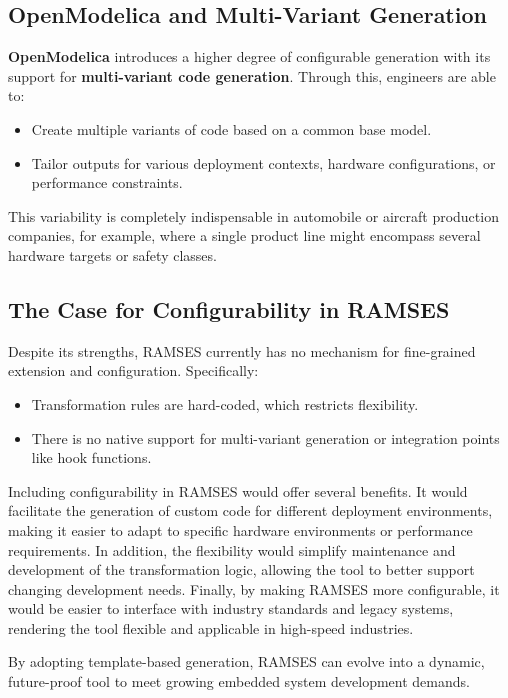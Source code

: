 \subsection*{OpenModelica and Multi-Variant Generation}

\textbf{OpenModelica} introduces a higher degree of configurable generation with its support for \textbf{multi-variant code generation}. Through this, engineers are able to:
\begin{itemize} 
	\item Create multiple variants of code based on a common base model.
	\item Tailor outputs for various deployment contexts, hardware configurations, or performance constraints.
\end{itemize}

This variability is completely indispensable in automobile or aircraft production companies, for example, where a single product line might encompass several hardware targets or safety classes.


\subsection*{The Case for Configurability in RAMSES}

Despite its strengths, \gls{RAMSES} currently has no mechanism for fine-grained extension and configuration.
Specifically:

\begin{itemize} 
	\item Transformation rules are hard-coded, which restricts flexibility.
	\item There is no native support for multi-variant generation or integration points like hook functions. 
\end{itemize}

Including configurability in \gls{RAMSES} would offer several benefits. It would facilitate the generation of custom code for different deployment environments, making it easier to adapt to specific hardware environments or performance requirements. In addition, the flexibility would simplify maintenance and development of the transformation logic, allowing the tool to better support changing development needs. Finally, by making \gls{RAMSES} more configurable, it would be easier to interface with industry standards and legacy systems, rendering the tool flexible and applicable in high-speed industries.

\begin{tcolorbox}[colback=green!5, colframe=green!40!black] By adopting template-based generation, \gls{RAMSES} can evolve into a dynamic, future-proof tool to meet growing embedded system development demands. \end{tcolorbox}

